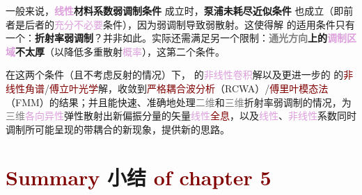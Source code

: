 一般来说，\textbf{\textcolor{Plum}{线性}材料系数\textcolor{NavyBlue}{弱调制}条件}  成立时，\textbf{\textcolor{NavyBlue}{泵浦未耗尽}近似条件}  也成立（即前者是后者的\textcolor{Plum}{充分不必要}条件），因为\textcolor{NavyBlue}{弱调制}导致\textcolor{NavyBlue}{弱散射}。这使得解  的适用条件只有一个：\textbf{\textcolor{PineGreen}{折射率}\textcolor{NavyBlue}{弱调制}}？并非如此。实际还需满足另一个限制：\textbf{\textcolor{gray}{通光方向}上的\textcolor{Plum}{调制区域}不太厚}（以降低\textcolor{NavyBlue}{多重散射}\textcolor{Plum}{概率}），这第二个条件。

在这两个条件（且不考虑反射的情况）下， 的\textcolor{Plum}{非线性卷积}解以及更进一步的  的\textcolor{Maroon}{非线性角谱}/\textcolor{Maroon}{傅立叶光学}解，收敛到\textcolor{Maroon}{严格耦合波分析}（RCWA）/\textcolor{Maroon}{傅里叶模态法}（FMM）的结果；并且能快速、准确地处理\textcolor{gray}{二维}和\textcolor{gray}{三维}\textcolor{PineGreen}{折射率}\textcolor{NavyBlue}{弱调制}的情况，为\textcolor{gray}{三维}\textcolor{Plum}{各向异性}\textcolor{NavyBlue}{弹性散射}出新偏振分量的矢量\textcolor{Plum}{线性}\textcolor{Maroon}{全息}，以及\textcolor{Plum}{线性}、\textcolor{Plum}{非线性}系数\textcolor{NavyBlue}{同时调制}所可能呈现的带\textcolor{NavyBlue}{耦合}的新现象，提供新的思路。

\section{\textcolor{Maroon}{Summary} 小结 \textcolor{Maroon}{of chapter 5}}\label{sec:summary-chapter5}

